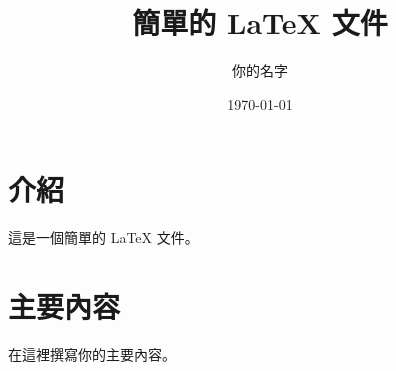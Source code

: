 \documentclass{article}
\title{簡單的 LaTeX 文件}
\author{你的名字}
\date{\today}
\begin{document}
\maketitle

\section{介紹}
這是一個簡單的 LaTeX 文件。

\section{主要內容}
在這裡撰寫你的主要內容。
\end{document}
